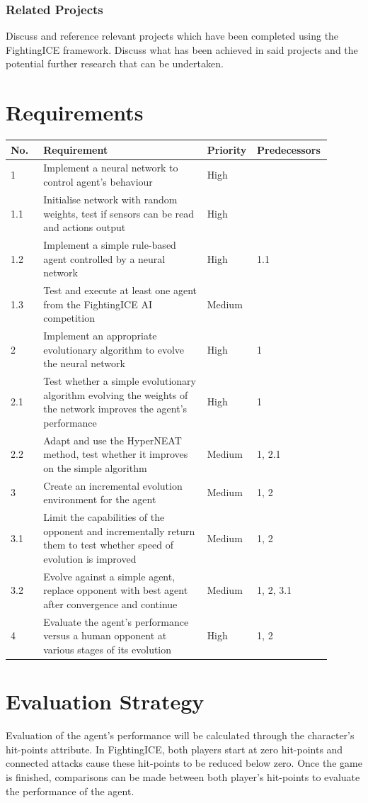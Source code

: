 \documentclass[11pt,a4paper]{article}
\begin{document}
\subsubsection{Related Projects}
Discuss and reference relevant projects which have been completed using the FightingICE framework. Discuss what has been achieved in said projects and the potential further research that can be undertaken.

\newpage
\section{Requirements}
\begin{tabular}{|p{0.1\linewidth}|p{0.5\linewidth}|p{0.1\linewidth}|p{0.2\linewidth}|}
\hline
No. & Requirement & Priority & Predecessors\\ \hline \hline
1 & Implement a neural network to control agent's behaviour & High &\\ \hline
1.1 & Initialise network with random weights, test if sensors can be read and actions output & High &\\ \hline
1.2 & Implement a simple rule-based agent controlled by a neural network & High & 1.1\\ \hline
1.3 & Test and execute at least one agent from the FightingICE AI competition & Medium &\\ \hline
2 & Implement an appropriate evolutionary algorithm to evolve the neural network & High & 1\\ \hline
2.1 & Test whether a simple evolutionary algorithm evolving the weights of the network improves the agent's performance & High & 1\\ \hline
2.2 & Adapt and use the HyperNEAT method, test whether it improves on the simple algorithm & Medium & 1, 2.1\\ \hline
3 & Create an incremental evolution environment for the agent & Medium & 1, 2\\ \hline
3.1 & Limit the capabilities of the opponent and incrementally return them to test whether speed of evolution is improved & Medium & 1, 2\\ \hline
3.2 & Evolve against a simple agent, replace opponent with best agent after convergence and continue & Medium & 1, 2, 3.1\\ \hline 
4 & Evaluate the agent's performance versus a human opponent at various stages of its evolution & High & 1, 2\\ \hline
\end{tabular}
\vfill
\section{Evaluation Strategy}
Evaluation of the agent's performance will be calculated through the character's hit-points attribute. In FightingICE, both players start at zero hit-points and connected attacks cause these hit-points to be reduced below zero. Once the game is finished, comparisons can be made between both player's hit-points to evaluate the performance of the agent.\\
\end{document}
